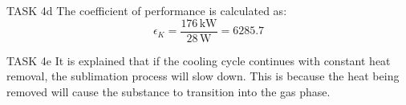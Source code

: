TASK 4d  
The coefficient of performance is calculated as:  
\[
\epsilon_K = \frac{176 \, \text{kW}}{28 \, \text{W}} = 6285.7
\]

TASK 4e  
It is explained that if the cooling cycle continues with constant heat removal, the sublimation process will slow down. This is because the heat being removed will cause the substance to transition into the gas phase.